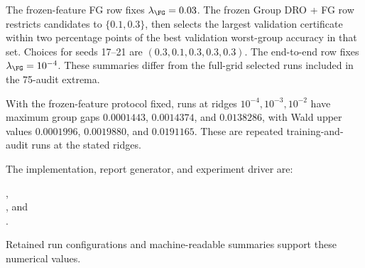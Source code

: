 The frozen-feature FG row fixes $\lambda_{\FG}=0.03$. The frozen Group DRO + FG row restricts candidates to $\{0.1,0.3\}$, then selects the largest validation certificate within two percentage points of the best validation worst-group accuracy in that set. Choices for seeds 17--21 are $(0.3,0.1,0.3,0.3,0.3)$. The end-to-end row fixes $\lambda_{\FG}=10^{-4}$. These summaries differ from the full-grid selected runs included in the 75-audit extrema.

With the frozen-feature protocol fixed, runs at ridges $10^{-4},10^{-3},10^{-2}$ have maximum group gaps $0.0001443$, $0.0014374$, and $0.0138286$, with Wald upper values $0.0001996$, $0.0019880$, and $0.0191165$. These are repeated training-and-audit runs at the stated ridges.

The implementation, report generator, and experiment driver are:\par
{\raggedright
{},\\
, and\\
.\par}
Retained run configurations and machine-readable summaries support these numerical values.
